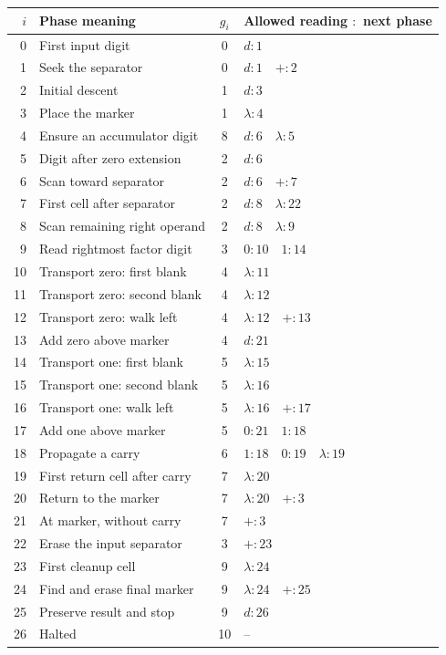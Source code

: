 \documentclass[11pt,a4paper]{article}
\newcommand{\blank}{\lambda}
\begin{document}
\begin{center}
\small\renewcommand{\arraystretch}{1.21}
\begin{tabular}{r l c l}
\toprule
\rowcolor{Pale}$i$ & Phase meaning & $g_i$ & Allowed reading $:$ next phase\\
\midrule
0 & First input digit & 0 & $d:1$ \\
1 & Seek the separator & 0 & $d:1\quad +:2$ \\
2 & Initial descent & 1 & $d:3$ \\
3 & Place the marker & 1 & $\blank:4$ \\
4 & Ensure an accumulator digit & 8 & $d:6\quad \blank:5$ \\
5 & Digit after zero extension & 2 & $d:6$ \\
6 & Scan toward separator & 2 & $d:6\quad +:7$ \\
7 & First cell after separator & 2 & $d:8\quad \blank:22$ \\
8 & Scan remaining right operand & 2 & $d:8\quad \blank:9$ \\
9 & Read rightmost factor digit & 3 & $0:10\quad 1:14$ \\
10 & Transport zero: first blank & 4 & $\blank:11$ \\
11 & Transport zero: second blank & 4 & $\blank:12$ \\
12 & Transport zero: walk left & 4 & $\blank:12\quad +:13$ \\
13 & Add zero above marker & 4 & $d:21$ \\
14 & Transport one: first blank & 5 & $\blank:15$ \\
15 & Transport one: second blank & 5 & $\blank:16$ \\
16 & Transport one: walk left & 5 & $\blank:16\quad +:17$ \\
17 & Add one above marker & 5 & $0:21\quad 1:18$ \\
18 & Propagate a carry & 6 & $1:18\quad 0:19\quad \blank:19$ \\
19 & First return cell after carry & 7 & $\blank:20$ \\
20 & Return to the marker & 7 & $\blank:20\quad +:3$ \\
21 & At marker, without carry & 7 & $+:3$ \\
22 & Erase the input separator & 3 & $+:23$ \\
23 & First cleanup cell & 9 & $\blank:24$ \\
24 & Find and erase final marker & 9 & $\blank:24\quad +:25$ \\
25 & Preserve result and stop & 9 & $d:26$ \\
26 & Halted & 10 & $\text{--}$ \\
\bottomrule
\end{tabular}
\end{center}
\end{document}

